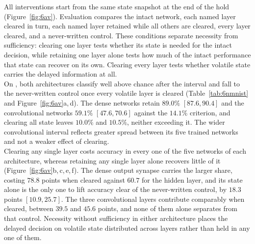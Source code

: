 \noindent All interventions start from the same state snapshot at the end of the hold
(Figure~\ref{fig:6av}). Evaluation compares the intact network, each named layer cleared in turn, each named layer
retained while all others are cleared, every layer cleared, and a never-written control. These conditions separate
necessity from sufficiency: clearing one layer tests whether its state is needed for the intact decision, while
retaining one layer alone tests how much of the intact performance that state can recover on its own. Clearing every
layer tests whether volatile state carries the delayed information at all.\\

\noindent On  \cite{orchard2015nmnist}, both architectures classify well above chance after the
interval and fall to the never-written control once every volatile layer is cleared (Table~\ref{tab:6nmnist} and
Figure~\ref{fig:6av}a,\,d). The dense networks retain $89.0\%$ $[87.6,90.4]$ and the convolutional networks $59.1\%$
$[47.6,70.6]$ against the $14.1\%$ criterion, and clearing all state leaves $10.0\%$ and $10.5\%$, neither exceeding
it. The wider convolutional interval reflects greater spread between its five trained networks and not a weaker effect
of clearing.\\

\noindent Clearing any single layer costs accuracy in every one of the five networks of each architecture, whereas retaining any single
layer alone recovers little of it (Figure~\ref{fig:6av}b,\,c,\,e,\,f). The dense output synapse carries the larger
share, costing $78.8$ points when cleared against $60.7$ for the hidden layer, and its state alone is the only one to
lift accuracy clear of the never-written control, by $18.3$ points $[10.9,25.7]$. The three convolutional layers
contribute comparably when cleared, between $39.5$ and $45.6$ points, and none of them alone separates from that
control. Necessity without sufficiency in either architecture places the delayed decision on volatile state
distributed across layers rather than held in any one of them.\\

